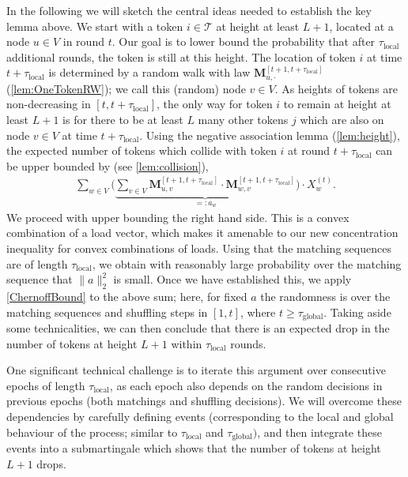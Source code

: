 \documentclass[twoside,leqno]{article}
\newcommand{\M}{\mathbf{M}}
\DeclareMathOperator{\1}{\mathbf{1}}
\newcommand{\taulocal}{\tau_{\mathrm{local}}}
\newcommand{\tauglobal}{\tau_{\mathrm{global}}}
\numberwithin{equation}{section}
\newcommand{\newL}{L}
\begin{document}
In the following we will sketch the central ideas needed to establish the key lemma above.
We start with a token $i \in \mathcal{T}$ at height at least $\newL+1$, located at a node $u \in V$ in round $t$. Our goal is to lower bound the probability that after $\taulocal$ additional rounds, the token is still at this height. The location of token $i$ at time $t+ \taulocal$ is determined by a random walk with law $\M_{u,\cdot}^{[t+1,t+\taulocal]}$ (\cref{lem:OneTokenRW}); we call this (random) node $v \in V$. As heights of tokens are non-decreasing in $[t,t+\taulocal]$, the only way for token $i$ to remain at height at least $\newL+1$ is for there to be at least $L$ many other tokens $j$ which are also on node $v \in V$ at time $t+\taulocal$. 
Using the negative association lemma (\cref{lem:height}), the expected number of tokens which collide with token $i$ at round $t+\taulocal$ can be upper bounded by (see \cref{lem:collision}),
\begin{align*}
 \sum_{w \in V}  \Biggl( \underbrace{ \sum_{v \in V}  
 \M_{u,v}^{[t+1,t+\taulocal]} \cdot \M_{w,v}^{[t+1,t+\taulocal]}}_{=:a_w}  \Biggr) \cdot X_w^{(t)}.
\end{align*}
We proceed with upper bounding the right hand side. This is a convex combination of a load vector, which makes it amenable to our new concentration inequality for convex combinations of loads. Using that the matching sequences are of length $\taulocal$, we obtain with reasonably large probability over the matching sequence that $\|a\|_2^2$ is small. Once we have established this, we apply \cref{ChernoffBound} to the above sum; here, for fixed $a$ the randomness is over the matching sequences and shuffling steps in $[1,t]$, where $t \geq \tauglobal$. Taking aside some technicalities, we can then conclude that there is an expected drop in the number of tokens at height $L+1$ within $\taulocal$ rounds. 

One significant technical challenge is to iterate this argument over consecutive epochs of length $\taulocal$, as each epoch also depends on the random decisions in previous epochs (both matchings and shuffling decisions). We will overcome these dependencies by carefully defining events (corresponding to the local and global behaviour of the process; similar to $\taulocal$ and $\tauglobal)$, and then integrate these events into a submartingale which shows that the number of tokens at height $L+1$ drops.
\end{document}
